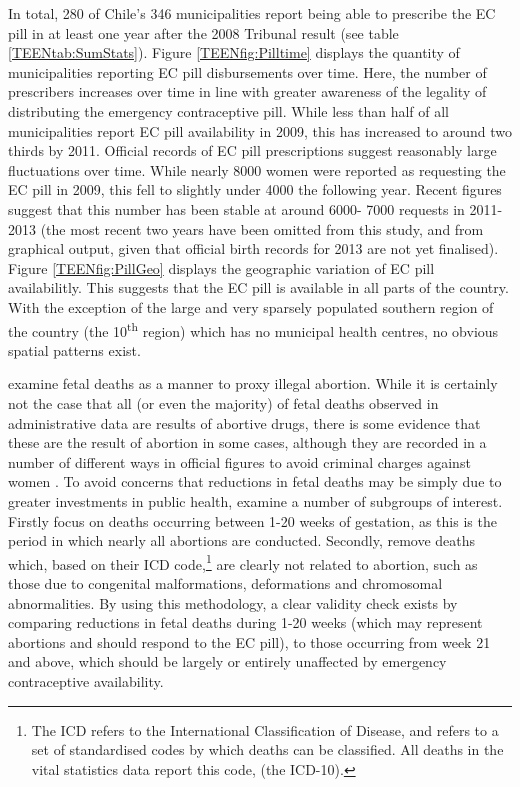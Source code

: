 In total, 280 of Chile's 346 municipalities report being able to prescribe the 
EC pill in at least one year after the 2008 Tribunal result (see table 
\ref{TEENtab:SumStats}). Figure \ref{TEENfig:Pilltime} displays the quantity
of municipalities reporting EC pill disbursements over time.  Here, the number
of prescribers increases over time in line with greater awareness of the legality 
of distributing the emergency contraceptive pill.  While less than half of all
municipalities report EC pill availability in 2009, this has increased to around
two thirds by 2011. Official records of EC pill prescriptions suggest reasonably
large fluctuations over time.  While nearly 8000 women were reported as 
requesting the EC pill in 2009, this fell to slightly under 4000 the following
year.  Recent figures suggest that this number has been stable at around 6000-%
7000 requests in 2011-2013 (the most recent two years have been omitted from
this study, and from graphical output, given that official birth records for
2013 are not yet finalised).  Figure \ref{TEENfig:PillGeo} displays
the geographic variation of EC pill availabilitly.  This suggests that the
EC pill is available in all parts of the country. With the exception of the
large and very sparsely populated southern region of the country (the 
10\textsuperscript{th} region) which has no municipal health centres, no 
obvious spatial patterns exist.

\Person examine fetal deaths as a manner to proxy illegal abortion.  While it 
is certainly not the case that all (or even the majority) of fetal deaths 
observed in administrative data are results of abortive drugs, there is some
evidence that these are the result of abortion in some cases, although they are 
recorded in a number of different ways in official figures to avoid criminal 
charges against women \citep{ShepardCasas2007}.  To avoid concerns that 
reductions in fetal deaths may be simply due to greater investments in public
health, \person examine a number of subgroups of interest.  Firstly \person focus 
on deaths occurring between 1-20 weeks of gestation, as this is the period in 
which nearly all abortions are conducted.  Secondly, \person remove deaths which,
based on their ICD code,\footnote{The ICD refers to the International 
Classification of Disease, and refers to a set of standardised codes by which
deaths can be classified.  All deaths in the vital statistics data report this 
code, (the ICD-10).} are clearly not related to abortion, such as those due to 
congenital malformations, deformations and chromosomal abnormalities.  By
using this methodology, a clear validity check exists by comparing reductions
in fetal deaths during 1-20 weeks (which may represent abortions and should
respond to the EC pill), to those occurring from week 21 and above,
which should be largely or entirely unaffected by emergency contraceptive
availability.

